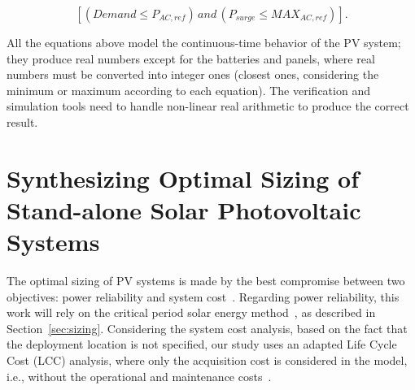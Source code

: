 \documentclass[runningheads]{llncs}
\begin{document}
\begin{equation}
\label{eq:invcheck} 
\left[ (Demand \leq P_{AC,ref}) \, and \, (P_{surge} \leq MAX_{AC,ref}) \right].
\end{equation}

All the equations above model the continuous-time behavior of the PV system; they produce real numbers except for the batteries and panels, where real numbers must be converted into integer ones (closest ones, considering the minimum or maximum according to each equation). The verification and simulation tools need to handle non-linear real arithmetic to produce the correct result.

\section{Synthesizing Optimal Sizing of Stand-alone Solar Photovoltaic Systems}

The optimal sizing of PV systems is made by the best compromise between two objectives: power reliability and system cost~\cite{Alsadi2018}. 
Regarding power reliability, this work will rely on the critical period solar energy method~\cite{Pinho}, as described in Section~\ref{sec:sizing}. 
Considering the system cost analysis, based on the fact that the deployment location is not specified, our study uses an adapted Life Cycle Cost (LCC) analysis, where only the acquisition cost is considered in the model, i.e., without the operational and maintenance costs~\cite{Alsadi2018}.
\end{document}
